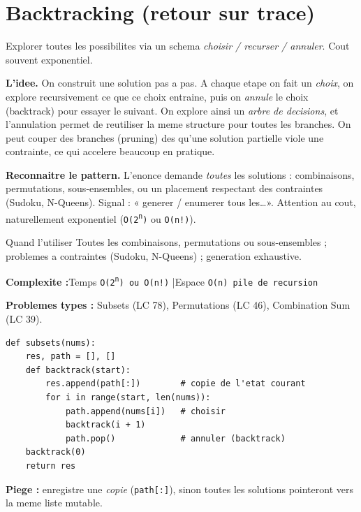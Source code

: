 \documentclass[11pt,a4paper]{article}
\newcommand{\complexite}[2]{%
  \noindent\textbf{Complexite :}\quad Temps \texttt{#1} \quad|\quad Espace \texttt{#2}\par\smallskip}
\newcommand{\leetcode}[1]{\noindent\textbf{Problemes types :} #1\par\medskip}
\begin{document}
\section{Backtracking (retour sur trace)}
Explorer toutes les possibilites via un schema \emph{choisir / recurser /
annuler}. Cout souvent exponentiel.

\textbf{L'idee.} On construit une solution pas a pas. A chaque etape on fait un
\emph{choix}, on explore recursivement ce que ce choix entraine, puis on
\emph{annule} le choix (backtrack) pour essayer le suivant. On explore ainsi un
\emph{arbre de decisions}, et l'annulation permet de reutiliser la meme structure
pour toutes les branches. On peut couper des branches (pruning) des qu'une
solution partielle viole une contrainte, ce qui accelere beaucoup en pratique.

\textbf{Reconnaitre le pattern.} L'enonce demande \emph{toutes} les solutions :
combinaisons, permutations, sous-ensembles, ou un placement respectant des
contraintes (Sudoku, N-Queens). Signal : « generer / enumerer tous les\ldots ».
Attention au cout, naturellement exponentiel (\texttt{O(2\textsuperscript{n})} ou
\texttt{O(n!)}).

\begin{infobox}{Quand l'utiliser}
Toutes les combinaisons, permutations ou sous-ensembles ; problemes a contraintes
(Sudoku, N-Queens) ; generation exhaustive.
\end{infobox}

\complexite{O(2\textsuperscript{n}) ou O(n!)}{O(n) pile de recursion}
\leetcode{Subsets (LC 78), Permutations (LC 46), Combination Sum (LC 39).}

\begin{lstlisting}
def subsets(nums):
    res, path = [], []
    def backtrack(start):
        res.append(path[:])        # copie de l'etat courant
        for i in range(start, len(nums)):
            path.append(nums[i])   # choisir
            backtrack(i + 1)
            path.pop()             # annuler (backtrack)
    backtrack(0)
    return res
\end{lstlisting}

\textbf{Piege :} enregistre une \emph{copie} (\texttt{path[:]}), sinon toutes les
solutions pointeront vers la meme liste mutable.

\end{document}
